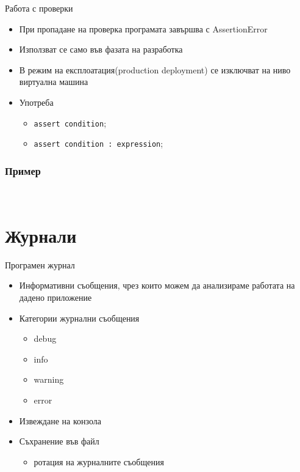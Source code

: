 \documentclass{beamer}
\begin{document}
\begin{frame}{Работа с проверки}
  \transdissolve
  \begin{itemize}
  \item При пропадане на проверка програмата завършва с AssertionError
  \item Използват се само във фазата на разработка
  \item В режим на експлоатация(production deployment) се изключват на
    ниво виртуална машина
  \item Употреба
    \begin{itemize}
      \item \lstinline$assert condition$;
      \item \lstinline$assert condition : expression$;
    \end{itemize}

  \end{itemize}
\end{frame}

\begin{frame}[fragile]
  \frametitle{Пример}
  \transdissolve
\begin{lstlisting}
  
\end{lstlisting}
\end{frame}


\section{Журнали}

\begin{frame}{Програмен журнал}
\transdissolve
\begin{itemize}
\item Информативни съобщения, чрез които можем да анализираме работата
  на дадено приложение
\item Категории журнални съобщения
\begin{itemize}
  \item debug
  \item info
  \item warning
  \item error
\end{itemize}
\item Извеждане на конзола
\item Съхранение във файл
\begin{itemize}
  \item ротация на журналните съобщения
\end{itemize}
\end{itemize}
\end{frame}
\end{document}

